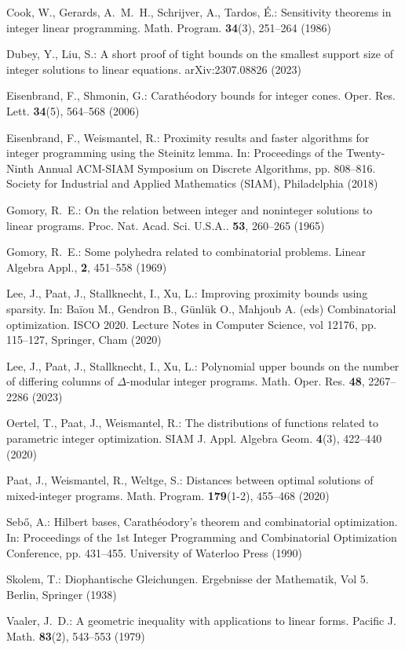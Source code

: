 \documentclass[runningheads]{llncs}
\renewcommand\>{\rangle}
\newcommand\<{\langle}
\newcommand\0{\mathbf{0}}
\begin{document}
\begin{thebibliography}{99}
Cook, W., Gerards, A.~M.~H., Schrijver, A., Tardos, \'{E}.:
Sensitivity theorems in integer linear programming.
Math. Program. \textbf{34}(3), 251--264 (1986)

Dubey, Y., Liu, S.:
A short proof of tight bounds on the smallest support size of integer solutions to linear equations.
arXiv:2307.08826 (2023)




Eisenbrand, F., Shmonin, G.:
Carath\'eodory bounds for integer cones.
Oper. Res. Lett. \textbf{34}(5), 564--568 (2006)

Eisenbrand, F., Weismantel, R.:
Proximity results and faster algorithms for integer programming using
 the Steinitz lemma.
In: Proceedings of the Twenty-Ninth Annual ACM-SIAM
 Symposium on Discrete Algorithms, pp. 808--816. Society for Industrial and Applied Mathematics (SIAM), Philadelphia (2018)

Gomory, R.~E.:
On the relation between integer and noninteger solutions to linear programs.
Proc. Nat. Acad. Sci. U.S.A.. \textbf{53}, 260--265 (1965)


Gomory, R.~E.:
Some polyhedra related to combinatorial problems.
Linear Algebra Appl., \textbf{2}, 451--558 (1969)

Lee, J., Paat, J., Stallknecht, I., Xu, L.:
Improving proximity bounds using sparsity.
In: Ba\"iou M., Gendron B., G\"unl\"uk O., Mahjoub A. (eds) Combinatorial optimization. ISCO 2020. Lecture Notes in Computer Science, vol 12176, pp. 115--127, Springer, Cham (2020)


Lee, J., Paat, J., Stallknecht, I., Xu, L.:
Polynomial upper bounds on the number of differing columns of {$\Delta$}-modular integer programs.
Math. Oper. Res. \textbf{48}, 2267--2286 (2023)


Oertel, T., Paat, J., Weismantel, R.:
The distributions of functions related to parametric integer optimization.
SIAM J. Appl. Algebra Geom. \textbf{4}(3), 422--440 (2020)


Paat, J., Weismantel, R., Weltge, S.:
Distances between optimal solutions of mixed-integer programs.
Math. Program.  \textbf{179}(1-2), 455–468 (2020)


Seb\H{o}, A.:
{H}ilbert bases, {C}arath\'eodory's theorem and combinatorial optimization.
In: Proceedings of the 1st Integer Programming and Combinatorial
  Optimization Conference, pp. 431--455. University of Waterloo Press (1990)

Skolem, T.:
Diophantische Gleichungen. Ergebnisse der Mathematik, Vol 5. Berlin, Springer (1938)


Vaaler, J.~D.:
A geometric inequality with applications to linear forms.
Pacific J. Math.  \textbf{83}(2), 543--553 (1979)


\end{thebibliography}
\end{document}
